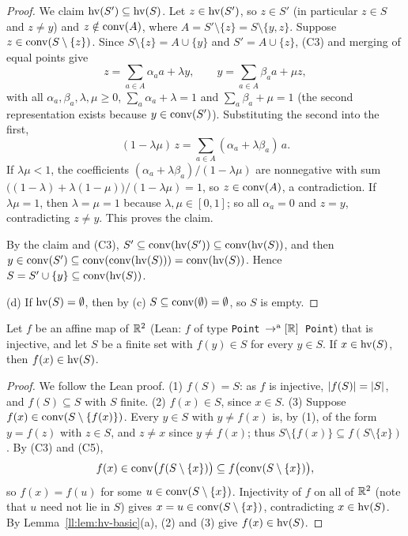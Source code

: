 \begin{proof}
We claim $\operatorname{hv}(S')\subseteq\operatorname{hv}(S)$. Let $z\in\operatorname{hv}(S')$, so $z\in S'$ (in particular $z\in S$ and $z\ne y$) and
$z\notin\operatorname{conv}(A)$, where $A=S'\setminus\{z\}=S\setminus\{y,z\}$. Suppose $z\in\operatorname{conv}(S\setminus\{z\})$. Since
$S\setminus\{z\}=A\cup\{y\}$ and $S'=A\cup\{z\}$, (C3) and merging of equal points give
\[z=\sum_{a\in A}\alpha_aa+\lambda y,\qquad y=\sum_{a\in A}\beta_aa+\mu z,\]
with all $\alpha_a,\beta_a,\lambda,\mu\ge0$, $\sum_a\alpha_a+\lambda=1$ and $\sum_a\beta_a+\mu=1$ (the second
representation exists because $y\in\operatorname{conv}(S')$). Substituting the second into the first,
\[(1-\lambda\mu)\,z=\sum_{a\in A}(\alpha_a+\lambda\beta_a)\,a .\]
If $\lambda\mu<1$, the coefficients $(\alpha_a+\lambda\beta_a)/(1-\lambda\mu)$ are nonnegative with sum
$\bigl((1-\lambda)+\lambda(1-\mu)\bigr)/(1-\lambda\mu)=1$, so $z\in\operatorname{conv}(A)$, a contradiction. If $\lambda\mu=1$, then
$\lambda=\mu=1$ because $\lambda,\mu\in[0,1]$; so all $\alpha_a=0$ and $z=y$, contradicting $z\ne y$. This proves the
claim.

By the claim and (C3), $S'\subseteq\operatorname{conv}(\operatorname{hv}(S'))\subseteq\operatorname{conv}(\operatorname{hv}(S))$, and then
$y\in\operatorname{conv}(S')\subseteq\operatorname{conv}(\operatorname{conv}(\operatorname{hv}(S)))=\operatorname{conv}(\operatorname{hv}(S))$. Hence $S=S'\cup\{y\}\subseteq\operatorname{conv}(\operatorname{hv}(S))$.

(d) If $\operatorname{hv}(S)=\emptyset$, then by (c) $S\subseteq\operatorname{conv}(\emptyset)=\emptyset$, so $S$ is empty.
\end{proof}

\begin{lemma}\label{ll:lem:map-hv}
Let $f$ be an affine map of $\mathbb R^2$ (Lean: $f$ of type \texttt{Point}~$\to^{\mathrm a}[\mathbb R]$~\texttt{Point}) that is
injective, and let $S$ be a finite set
with $f(y)\in S$ for every $y\in S$. If $x\in\operatorname{hv}(S)$, then $f(x)\in\operatorname{hv}(S)$.
\end{lemma}

\begin{proof}
We follow the Lean proof. (1) $f(S)=S$: as $f$ is injective, $\lvert f(S)\rvert=\lvert S\rvert$, and $f(S)\subseteq S$ with $S$
finite. (2) $f(x)\in S$, since $x\in S$. (3) Suppose $f(x)\in\operatorname{conv}(S\setminus\{f(x)\})$. Every $y\in S$ with
$y\ne f(x)$ is, by (1), of the form $y=f(z)$ with $z\in S$, and $z\ne x$ since $y\ne f(x)$; thus
$S\setminus\{f(x)\}\subseteq f(S\setminus\{x\})$. By (C3) and (C5),
\[f(x)\in\operatorname{conv}\bigl(f(S\setminus\{x\})\bigr)\subseteq f\bigl(\operatorname{conv}(S\setminus\{x\})\bigr),\]
so $f(x)=f(u)$ for some $u\in\operatorname{conv}(S\setminus\{x\})$. Injectivity of $f$ on all of $\mathbb R^2$ (note that $u$ need not lie
in $S$) gives $x=u\in\operatorname{conv}(S\setminus\{x\})$, contradicting $x\in\operatorname{hv}(S)$. By Lemma~\ref{ll:lem:hv-basic}(a), (2) and
(3) give $f(x)\in\operatorname{hv}(S)$.
\end{proof}

